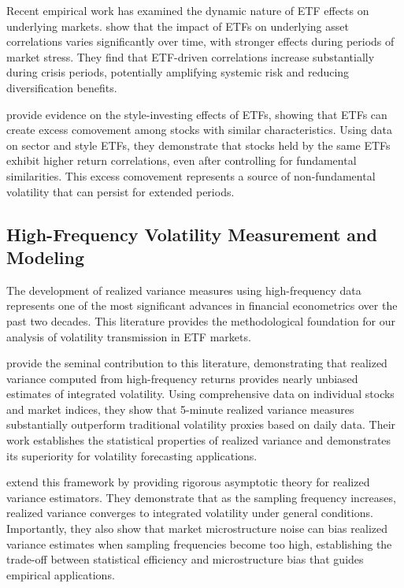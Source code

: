 Recent empirical work has examined the dynamic nature of ETF effects on underlying markets. \citet{da2018exchange} show that the impact of ETFs on underlying asset correlations varies significantly over time, with stronger effects during periods of market stress. They find that ETF-driven correlations increase substantially during crisis periods, potentially amplifying systemic risk and reducing diversification benefits.

\citet{broman2016liquidity} provide evidence on the style-investing effects of ETFs, showing that ETFs can create excess comovement among stocks with similar characteristics. Using data on sector and style ETFs, they demonstrate that stocks held by the same ETFs exhibit higher return correlations, even after controlling for fundamental similarities. This excess comovement represents a source of non-fundamental volatility that can persist for extended periods.

\subsection{High-Frequency Volatility Measurement and Modeling}

The development of realized variance measures using high-frequency data represents one of the most significant advances in financial econometrics over the past two decades. This literature provides the methodological foundation for our analysis of volatility transmission in ETF markets.

\citet{andersen2001distribution} provide the seminal contribution to this literature, demonstrating that realized variance computed from high-frequency returns provides nearly unbiased estimates of integrated volatility. Using comprehensive data on individual stocks and market indices, they show that 5-minute realized variance measures substantially outperform traditional volatility proxies based on daily data. Their work establishes the statistical properties of realized variance and demonstrates its superiority for volatility forecasting applications.

\citet{barndorff2002econometric} extend this framework by providing rigorous asymptotic theory for realized variance estimators. They demonstrate that as the sampling frequency increases, realized variance converges to integrated volatility under general conditions. Importantly, they also show that market microstructure noise can bias realized variance estimates when sampling frequencies become too high, establishing the trade-off between statistical efficiency and microstructure bias that guides empirical applications.


